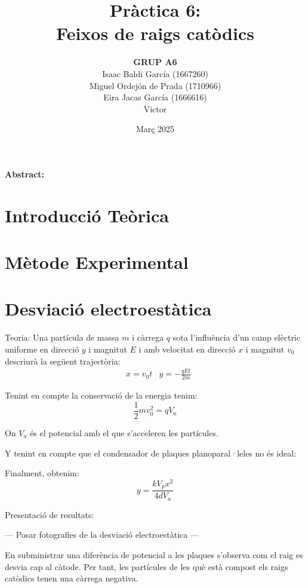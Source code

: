 \documentclass[11pt]{article}
\title{\Huge\bfseries Pràctica 6: \\ Feixos de raigs catòdics \\ [2ex] \Large}
\author{\begin{tabular}{c}
\textbf{GRUP A6} \\
Isaac Baldi García (1667260)\\
Miguel Ordejón de Prada (1710966) \\
Eira Jacas García (1666616) \\
Victor
\end{tabular}}
\date{Març 2025}
\begin{document}
\maketitle
\begin{center}
    \textbf{Abstract:} 
\end{center}


\newpage

\tableofcontents
\newpage

\section{Introducció Teòrica}

\section{Mètode Experimental}

\section{Desviació electroestàtica}\label{sec: desv_electr}

Teoria:
Una partícula de massa $m$ i càrrega $q$ sota l'influència d'un camp elèctric uniforme en direcció $y$ i magnitut $E$ i amb velocitat en direcció $x$ i magnitut $v_0$ descriurà la següent trajectòria:
\begin{align*}
    &x = v_0 t      &y = -\frac{qEt}{2m}
\end{align*}

Tenint en compte la conservació de la energia tenim:
\begin{equation*}
    \frac{1}{2}mv_0^2=qV_a
\end{equation*}

On $V_a$ és el potencial amb el que s'acceleren les partícules.

Y tenint en compte que el condensador de plaques planoparal·leles no és ideal:

Finalment, obtenim:
\begin{equation*}
    y = \frac{kV_px^2}{4dV_a}
\end{equation*}


Presentació de resultats:

--- Posar fotografies de la desviació electroestàtica ---

En subministrar una diferència de potencial a les plaques s'observa com el raig es desvia cap al càtode. Per tant, les partícules de les què està compost els raigs catòdics tenen una càrrega negativa.
\end{document}
